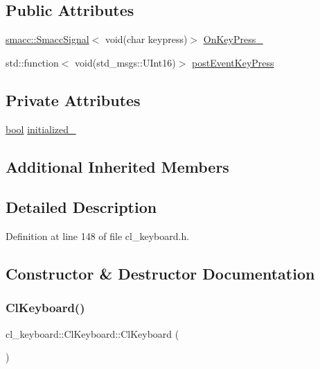 \subsection*{Public Attributes}
\begin{DoxyCompactItemize}
\item 
\hyperlink{classsmacc_1_1SmaccSignal}{smacc\+::\+Smacc\+Signal}$<$ void(char keypress)$>$ \hyperlink{classcl__keyboard_1_1ClKeyboard_ae7fb61a86ed9cdd313f0cc1b2661c63c}{On\+Key\+Press\+\_\+}
\item 
std\+::function$<$ void(std\+\_\+msgs\+::\+U\+Int16)$>$ \hyperlink{classcl__keyboard_1_1ClKeyboard_ae9811fd50207ba9b69a4f27e7f8b4e86}{post\+Event\+Key\+Press}
\end{DoxyCompactItemize}
\subsection*{Private Attributes}
\begin{DoxyCompactItemize}
\item 
\hyperlink{classbool}{bool} \hyperlink{classcl__keyboard_1_1ClKeyboard_a96128ed5180e0dc5cfe76c90a9f8e8f7}{initialized\+\_\+}
\end{DoxyCompactItemize}
\subsection*{Additional Inherited Members}


\subsection{Detailed Description}


Definition at line 148 of file cl\+\_\+keyboard.\+h.



\subsection{Constructor \& Destructor Documentation}
\mbox{\label{classcl__keyboard_1_1ClKeyboard_aadf021c18ad32c50bd8b02f62293a47e}} 
\subsubsection{\texorpdfstring{Cl\+Keyboard()}{ClKeyboard()}}
{\footnotesize\ttfamily cl\+\_\+keyboard\+::\+Cl\+Keyboard\+::\+Cl\+Keyboard (\begin{DoxyParamCaption}{ }\end{DoxyParamCaption})}



